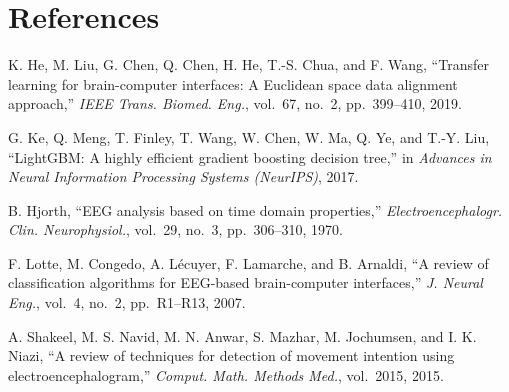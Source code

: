 \documentclass[12pt,a4paper]{article}
\begin{document}
\section*{References}

\begin{enumerate}[label={[\arabic*]},leftmargin=2em]
  \item K. He, M. Liu, G. Chen, Q. Chen, H. He, T.-S. Chua, and F. Wang,
        ``Transfer learning for brain-computer interfaces: A Euclidean space
        data alignment approach,'' \textit{IEEE Trans. Biomed. Eng.},
        vol.~67, no.~2, pp.~399--410, 2019. \label{he2019transfer}

  \item G. Ke, Q. Meng, T. Finley, T. Wang, W. Chen, W. Ma, Q. Ye, and
        T.-Y. Liu, ``LightGBM: A highly efficient gradient boosting decision
        tree,'' in \textit{Advances in Neural Information Processing Systems
        (NeurIPS)}, 2017. \label{ke2017lightgbm}

  \item B. Hjorth, ``EEG analysis based on time domain properties,''
        \textit{Electroencephalogr. Clin. Neurophysiol.}, vol.~29, no.~3,
        pp.~306--310, 1970. \label{hjorth1970eeg}

  \item F. Lotte, M. Congedo, A. Lécuyer, F. Lamarche, and B. Arnaldi,
        ``A review of classification algorithms for EEG-based
        brain-computer interfaces,'' \textit{J. Neural Eng.}, vol.~4, no.~2,
        pp.~R1--R13, 2007.

  \item A. Shakeel, M. S. Navid, M. N. Anwar, S. Mazhar, M. Jochumsen,
        and I. K. Niazi, ``A review of techniques for detection of movement
        intention using electroencephalogram,''
        \textit{Comput. Math. Methods Med.}, vol.~2015, 2015.
\end{enumerate}
\end{document}
